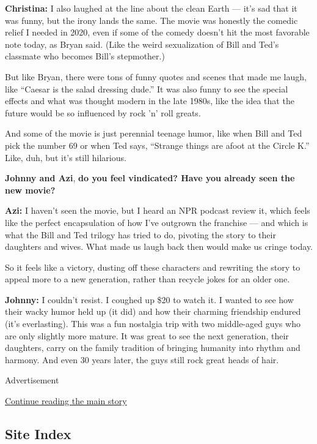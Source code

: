\textbf{Christina:} I also laughed at the line about the clean Earth ---
it's sad that it was funny, but the irony lands the same. The movie was
honestly the comedic relief I needed in 2020, even if some of the comedy
doesn't hit the most favorable note today, as Bryan said. (Like the
weird sexualization of Bill and Ted's classmate who becomes Bill's
stepmother.)

But like Bryan, there were tons of funny quotes and scenes that made me
laugh, like ``Caesar is the salad dressing dude.'' It was also funny to
see the special effects and what was thought modern in the late 1980s,
like the idea that the future would be so influenced by rock 'n' roll
greats.

And some of the movie is just perennial teenage humor, like when Bill
and Ted pick the number 69 or when Ted says, ``Strange things are afoot
at the Circle K.'' Like, duh, but it's still hilarious.

\textbf{Johnny and Azi}, \textbf{do you feel vindicated? Have you
already seen the new movie?}

\textbf{Azi:} I haven't seen the movie, but I heard an NPR podcast
review it, which feels like the perfect encapsulation of how I've
outgrown the franchise --- and which is what the Bill and Ted trilogy
has tried to do, pivoting the story to their daughters and wives. What
made us laugh back then would make us cringe today.

So it feels like a victory, dusting off these characters and rewriting
the story to appeal more to a new generation, rather than recycle jokes
for an older one.

\textbf{Johnny:} I couldn't resist. I coughed up \$20 to watch it. I
wanted to see how their wacky humor held up (it did) and how their
charming friendship endured (it's everlasting). This was a fun nostalgia
trip with two middle-aged guys who are only slightly more mature. It was
great to see the next generation, their daughters, carry on the family
tradition of bringing humanity into rhythm and harmony. And even 30
years later, the guys still rock great heads of hair.

Advertisement

\protect\hyperlink{after-bottom}{Continue reading the main story}

\hypertarget{site-index}{%
\subsection{Site Index}\label{site-index}}

